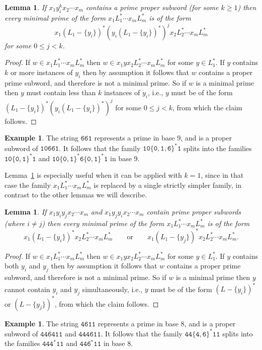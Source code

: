 \documentclass[12pt]{article}
\theoremstyle{plain}
\newtheorem{lemma}[theorem]{Lemma}
\theoremstyle{definition}
\newtheorem{example}[theorem]{Example}
\newcommand{\0}{\mathtt{0}}
\newcommand{\1}{\mathtt{1}}
\newcommand{\2}{\mathtt{2}}
\newcommand{\3}{\mathtt{3}}
\newcommand{\4}{\mathtt{4}}
\newcommand{\5}{\mathtt{5}}
\newcommand{\6}{\mathtt{6}}
\newcommand{\7}{\mathtt{7}}
\newcommand{\8}{\mathtt{8}}
\newcommand{\9}{\mathtt{9}}
\newcommand{\updated}[1]{{\color{red}#1}}
\renewcommand{\updated}[1]{#1}
\begin{document}
\begin{lemma}\label{lemsplit1}
If\/ $x_1y_i^kx_2\dotsm x_m$ contains a prime proper subword (for some\/ $k\geq1$) then every minimal prime of the form\/
$x_1L_1^*\dotsm x_mL_m^*$ is of the form \[x_1(L_1-\{y_i\})^*(y_i(L_1-\{y_i\})^*)^jx_2L_2^*\dotsm x_mL_m^*\]
for some\/ $0\leq j<k$.
\end{lemma}
\begin{proof}
If $w\in x_1L_1^*\dotsm x_mL_m^*$ then $w\in x_1yx_2L_2^*\dotsm x_mL_m^*$ for some $y\in L_1^*$.
If $y$ contains $k$ or more instances of $y_i$ then by assumption it follows that $w$ contains a proper prime subword,
and therefore is not a minimal prime.  So if $w$ is a minimal prime then $y$ must contain less than $k$
instances of $y_i$, i.e., $y$ must be of the form $(L_1-\{y_i\})^*(y_i(L_1-\{y_i\})^*)^j$ for some $0\leq j<k$,
from which the claim follows.
\end{proof}
\begin{example}
The string $\6\6\1$ represents a prime in base 9, and is a proper subword of $\1\0\6\6\1$.  It follows that
the family $\1\0\{\0,\1,\6\}^*\1$ splits into the families
$\1\0\{\0,\1\}^*\1$ and $\1\0\{\0,\1\}^*\6\{\0,\1\}^*\1$ in base 9.
\end{example}

Lemma~\ref{lemsplit1} is especially useful when it can be applied with $k=1$, since in that case the family $x_1L_1^*\dotsm x_mL_m^*$
is replaced by a single strictly simpler family, in contrast to the other lemmas we will describe.

\begin{lemma}\label{lemsplit2}
If\/ $x_1y_iy_jx_2\dotsm x_m$ and\/ $x_1\updated{y_jy_i}x_2\dotsm x_m$ contain prime proper subwords (where\/ $i\neq j$) then 
every minimal prime of the form\/ $x_1L_1^*\dotsm x_mL_m^*$ is of the form
\[x_1(L_1-\{y_i\})^*x_2L_2^*\dotsm x_mL_m^* \qquad\text{or}\qquad x_1(L_1-\{y_j\})^*x_2L_2^*\dotsm x_mL_m^* . \]
\end{lemma}
\begin{proof}
If $w\in x_1L_1^*\dotsm x_mL_m^*$ then $w\in x_1yx_2L_2^*\dotsm x_mL_m^*$ for some $y\in L_1^*$.
If $y$ contains both $y_i$ and $y_j$ then by assumption it follows that $w$ contains a proper prime subword,
and therefore is not a minimal prime.  So if $w$ is a minimal prime then $y$ cannot contain $y_i$ and $y_j$
simultaneously, i.e., $y$ must be of the form $(L-\{y_i\})^*$ or $(L-\{y_j\})^*$, from which the claim follows.
\end{proof}
\begin{example}
The string $\4\6\1\1$ represents a prime in base 8, and is a proper subword of $\4\4\6\4\1\1$ and $\4\4\4\6\1\1$.
It follows that the family $\4\4\{\4,\6\}^*\1\1$ splits into the families
$\4\4\4^*\1\1$ and $\4\4\6^*\1\1$ in base 8.
\end{example}
\end{document}
